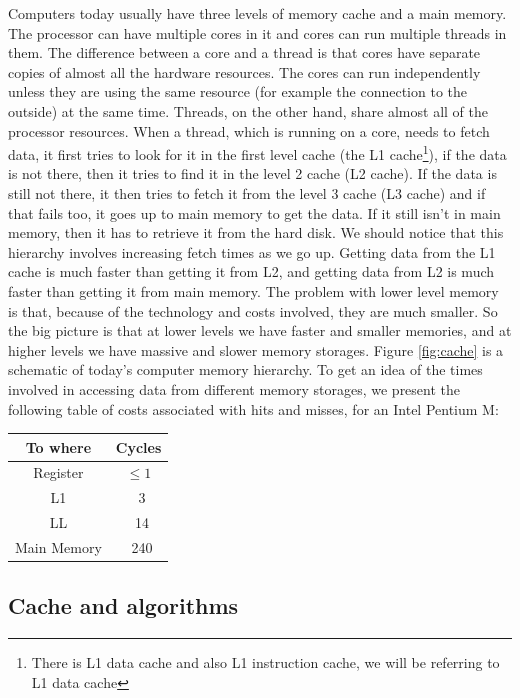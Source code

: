 \documentclass[12pt]{diicc}
\begin{document}
Computers today usually have three levels of memory cache and a main memory. The processor can have multiple cores in it and cores can run multiple threads in them. The difference between a core and a thread is that cores have separate copies of almost all the hardware resources. The cores can run independently unless they are using the same resource (for example the connection to the outside) at the same time. Threads, on the other hand, share almost all of the processor resources. When a thread, which is running on a core, needs to fetch data, it first tries to look for it in the first level cache (the L1 cache\footnote{There is L1 data cache and also L1 instruction cache, we will be referring to L1 data cache}), if the data is not there, then it tries to find it in the level 2 cache (L2 cache). If the data is still not there, it then tries to fetch it from the level 3 cache (L3 cache) and if that fails too, it goes up to main memory to get the data. If it still isn't in main memory, then it has to retrieve it from the hard disk. We should notice that this hierarchy involves increasing fetch times as we go up. Getting data from the L1 cache is much faster than getting it from L2, and getting data from L2 is much faster than getting it from main memory. The problem with lower level memory is that, because of the technology and costs involved, they are much smaller. So the big picture is that at lower levels we have faster and smaller memories, and at higher levels we have massive and slower memory storages. Figure \ref{fig:cache} is a schematic of today's computer memory hierarchy. To get an idea of the times involved in accessing data from different memory storages, we present the following table of costs associated with hits and misses, for an Intel Pentium M:
\begin{center}
\begin{tabular}{ c | c }
  To where & Cycles \\ \hline
  Register & $\leq 1$ \\
  L1 & ~3 \\ 
  LL & ~14 \\
  Main Memory & ~240 \\
\end{tabular}
\end{center}
 
\subsection{Cache and algorithms} 
 
\end{document}
